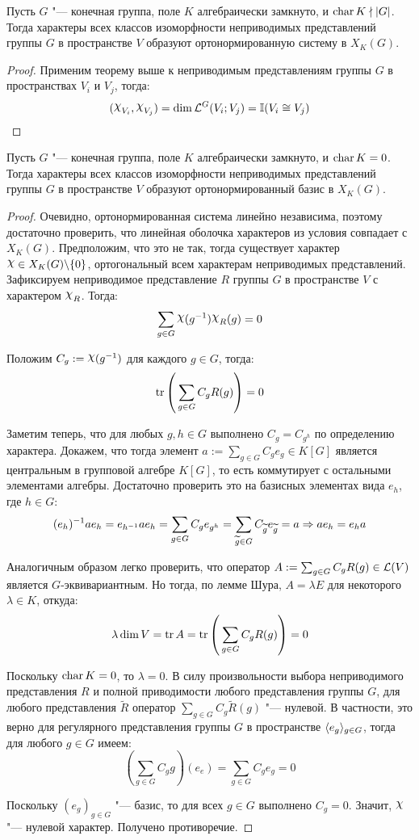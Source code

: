 \begin{corollary}
	Пусть $G$ "--- конечная группа, поле $K$ алгебраически замкнуто, и $\operatorname{char}{K} \nmid |G|$. Тогда характеры всех классов изоморфности неприводимых представлений группы $G$ в пространстве $V$ образуют ортонормированную систему в $X_K(G)$.
\end{corollary}

\begin{proof}
	Применим теорему выше к неприводимым представлениям группы $G$ в пространствах $V_i$ и $V_j$, тогда:
	\[(\Chi_{V_i}, \Chi_{V_j}) = \dim \mc L^G(V_i; V_j) = \mathbb I(V_i \cong V_j)\qedhere\]
\end{proof}

\begin{theorem}
	Пусть $G$ "--- конечная группа, поле $K$ алгебраически замкнуто, и $\operatorname{char}{K} = 0$. Тогда характеры всех классов изоморфности неприводимых представлений группы $G$ в пространстве $V$ образуют ортонормированный базис в $X_K(G)$.
\end{theorem}

\begin{proof}
	Очевидно, ортонормированная система линейно независима, поэтому достаточно проверить, что линейная оболочка характеров из условия совпадает с $X_K(G)$. Предположим, что это не так, тогда существует характер $\Chi \in X_K(G)\bs\{0\}$, ортогональный всем характерам неприводимых представлений. Зафиксируем неприводимое представление $R$ группы $G$ в пространстве $V$ с характером $\Chi_R$. Тогда:
	\[\sum_{g \in G}\Chi{(g^{-1})}\Chi_R(g) = 0\]
	
	Положим $C_g := \Chi(g^{-1})$ для каждого $g \in G$, тогда:
	\[\operatorname{tr}\left(\,\sum_{g \in G}C_g R(g)\right) = 0\]
	
	Заметим теперь, что для любых $g, h \in G$ выполнено $C_{g} = C_{g^h}$ по определению характера. Докажем, что тогда элемент $a := \sum_{g \in G}C_ge_g \in K[G]$ является центральным в групповой алгебре $K[G]$, то есть коммутирует с остальными элементами алгебры. Достаточно проверить это на базисных элементах вида $e_h$, где $h \in G$:
	\[(e_{h})^{-1}ae_h = e_{h^{-1}}ae_h = \sum_{g \in G}C_ge_{g^h} = \sum_{\widetilde g \in G}C_{\widetilde g}e_{\widetilde g} = a \Rightarrow ae_h = e_ha\]
	
	Аналогичным образом легко проверить, что оператор $A := \sum_{g \in G}C_gR(g) \in \mathcal L(V)$ является $G$-эквивариантным. Но тогда, по лемме Шура, $A = \lambda E$ для некоторого $\lambda \in K$, откуда:
	\[\lambda\dim{V} = \operatorname{tr}{A} = \operatorname{tr}\left(\,\sum_{g \in G}C_gR(g)\right) = 0\]
	
	Поскольку $\operatorname{char}{K} = 0$, то $\lambda = 0$. В силу произвольности выбора неприводимого представления $R$ и полной приводимости любого представления группы $G$, для любого представления $\widetilde R$ оператор $\sum_{g \in G}C_g\widetilde R(g)$ "--- нулевой. В частности, это верно для регулярного представления группы $G$ в пространстве $\langle e_g \rangle_{g \in G}$, тогда для любого $g \in G$ имеем:
	\[\left(\sum_{g \in G}C_gg\right)(e_e) = \sum_{g \in G}C_ge_g = 0\]
	
	Поскольку $(e_g)_{g \in G}$ "--- базис, то для всех $g \in G$ выполнено $C_g = 0$. Значит, $\Chi$ "--- нулевой характер. Получено противоречие.	
\end{proof}

